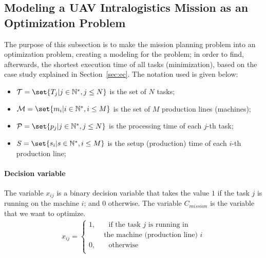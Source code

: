 \documentclass[conference]{IEEEtran}
\begin{document}
\subsection{Modeling a UAV Intralogistics Mission as an Optimization Problem }
\label{ssec:modelo}

The purpose of this subsection is to make the mission planning problem into an optimization problem, creating a modeling for the problem; in order to find, afterwards, the shortest execution time of all tasks (minimization), based on the case study explained in Section~\ref{sec:ec}. The notation used is given below:

\begin{itemize}
\item $\mathcal{T} = \set{T_j \vert j\in \mathbb{N}^{*},j\leq N}$ is the set of $N$ tasks;
\item $\mathcal{M} = \set{m_i \vert i\in \mathbb{N}^{*},i\leq M}$ is the set of $M$ production lines (machines);
\item $\mathcal{P} = \set{p_j \vert j\in \mathbb{N}^{*},j\leq N}$ is the processing time of each $j$-th task;
\item $S = \set{s_i \vert s\in \mathbb{N}^{*},i\leq M}$  is the setup (production) time of each $i$-th production line;
\end{itemize}

\paragraph{Decision variable}

The variable $x_{ij}$ is a binary decision variable that takes the value $1$ if the task $j$ is running on the machine $i$; and $0$ otherwise. The variable $C_ {mission}$ is the variable that we want to optimize.
%
\begin{equation}
\label{eq:decision}
\begin{split}
x_{ij}=\begin{cases}
    1,       & \quad \text{if the task } j \text{ is running in} \\
 &\text{ the machine (production line) }i\\
    0,  & \quad \text{otherwise}\\
  \end{cases}
\end{split}
\end{equation}
\end{document}

